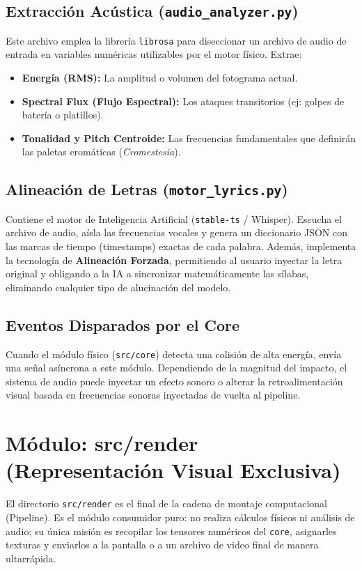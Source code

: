 \documentclass[12pt, openany]{book}
\begin{document}
\subsection{Extracción Acústica (\texttt{audio\_analyzer.py})}
Este archivo emplea la librería \texttt{librosa} para diseccionar un archivo de audio de entrada en variables numéricas utilizables por el motor físico. Extrae:
\begin{itemize}
    \item \textbf{Energía (RMS):} La amplitud o volumen del fotograma actual.
    \item \textbf{Spectral Flux (Flujo Espectral):} Los ataques transitorios (ej: golpes de batería o platillos).
    \item \textbf{Tonalidad y Pitch Centroide:} Las frecuencias fundamentales que definirán las paletas cromáticas (\textit{Cromestesia}).
\end{itemize}

\subsection{Alineación de Letras (\texttt{motor\_lyrics.py})}
Contiene el motor de Inteligencia Artificial (\texttt{stable-ts} / Whisper). Escucha el archivo de audio, aísla las frecuencias vocales y genera un diccionario JSON con las marcas de tiempo (timestamps) exactas de cada palabra. Además, implementa la tecnología de \textbf{Alineación Forzada}, permitiendo al usuario inyectar la letra original y obligando a la IA a sincronizar matemáticamente las sílabas, eliminando cualquier tipo de alucinación del modelo.

\subsection{Eventos Disparados por el Core}
Cuando el módulo físico (\texttt{src/core}) detecta una colisión de alta energía, envía una señal asíncrona a este módulo. Dependiendo de la magnitud del impacto, el sistema de audio puede inyectar un efecto sonoro o alterar la retroalimentación visual basada en frecuencias sonoras inyectadas de vuelta al pipeline.

\section{Módulo: src/render (Representación Visual Exclusiva)}

El directorio \texttt{src/render} es el final de la cadena de montaje computacional (Pipeline). Es el módulo consumidor puro: no realiza cálculos físicos ni análisis de audio; su única misión es recopilar los tensores numéricos del \texttt{core}, asignarles texturas y enviarlos a la pantalla o a un archivo de video final de manera ultarrápida.
\end{document}
